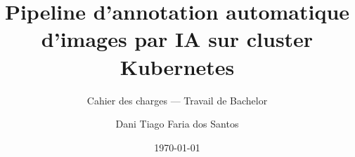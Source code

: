 \author{Dani Tiago Faria dos Santos}


\title{Pipeline d'annotation automatique d'images par IA sur cluster Kubernetes}

\subtitle{Cahier des charges --- Travail de Bachelor}


\date{\today}


